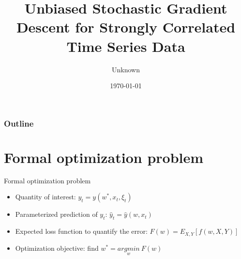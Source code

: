 \documentclass{beamer}
\title[Oral Qualification Examination]{Unbiased Stochastic Gradient Descent for Strongly Correlated Time Series Data} %
\author{Unknown} %
\institute[IORA] %
{
Supervisor: Unknown\\
National University of Singapore \\ %


\medskip
}
\date{\today} %
\begin{document}
\begin{frame}
\titlepage %
\end{frame}






\begin{frame}
\frametitle{Outline} %
\tableofcontents %
\end{frame}


\section{Formal optimization problem}
\begin{frame}{Formal optimization problem}
    \begin{itemize}
        \item Quantity of interest: $y_t = y(w^*,x_t,\xi_t)$
        \item Parameterized prediction of $y_t$: $\hat{y}_t=\hat{y}(w,x_t)$
        \item 
        Expected loss function to quantify the error: $F(w) = E_{X,Y}[f(w,X,Y)]$
        \item Optimization objective: find $w^*=\underset{w}{argmin}\:F(w)$
        
    \end{itemize}


    
\end{frame}
\end{document}
